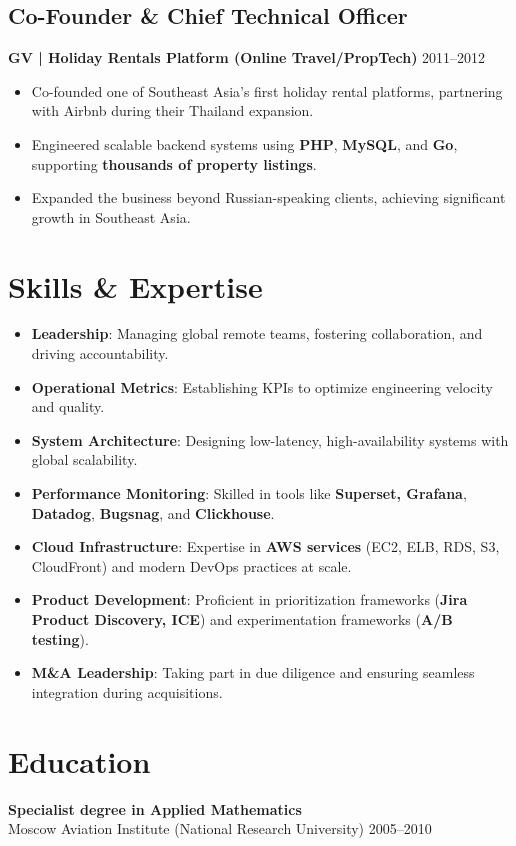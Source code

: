 \documentclass[11pt,a4paper]{article}
\begin{document}
\subsection*{Co-Founder \& Chief Technical Officer}
\textbf{GV | Holiday Rentals Platform (Online Travel/PropTech)} \hfill 2011--2012
\begin{itemize}
    \item Co-founded one of Southeast Asia’s first holiday rental platforms, partnering with Airbnb during their Thailand expansion.
    \item Engineered scalable backend systems using \textbf{PHP}, \textbf{MySQL}, and \textbf{Go}, supporting \textbf{thousands of property listings}.
    \item Expanded the business beyond Russian-speaking clients, achieving significant growth in Southeast Asia.
\end{itemize}

\section*{Skills \& Expertise}
\begin{itemize}
    \item \textbf{Leadership}: Managing global remote teams, fostering collaboration, and driving accountability.
    \item \textbf{Operational Metrics}: Establishing KPIs to optimize engineering velocity and quality.
    \item \textbf{System Architecture}: Designing low-latency, high-availability systems with global scalability.
    \item \textbf{Performance Monitoring}: Skilled in tools like \textbf{Superset, Grafana}, \textbf{Datadog}, \textbf{Bugsnag}, and \textbf{Clickhouse}.
    \item \textbf{Cloud Infrastructure}: Expertise in \textbf{AWS services} (EC2, ELB, RDS, S3, CloudFront) and modern DevOps practices at scale.
    \item \textbf{Product Development}: Proficient in prioritization frameworks (\textbf{Jira Product Discovery, ICE}) and experimentation frameworks (\textbf{A/B testing}).
    \item \textbf{M\&A Leadership}: Taking part in due diligence and ensuring seamless integration during acquisitions.
\end{itemize}

\section*{Education}
\textbf{Specialist degree in Applied Mathematics} \\
Moscow Aviation Institute (National Research University) \hfill 2005--2010
\end{document}
